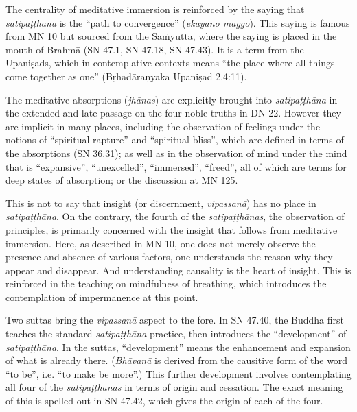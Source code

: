 \documentclass[12pt,openany]{book}%
\begin{document}
The centrality of meditative immersion is reinforced by the saying that \textit{\textsanskrit{satipaṭṭhāna}} is the “path to convergence” (\textit{\textsanskrit{ekāyano} maggo}). This saying is famous from MN 10 but sourced from the \textsanskrit{Saṁyutta}, where the saying is placed in the mouth of \textsanskrit{Brahmā} (SN 47.1, SN 47.18, SN 47.43). It is a term from the \textsanskrit{Upaniṣads}, which in contemplative contexts means “the place where all things come together as one” (\textsanskrit{Bṛhadāraṇyaka} \textsanskrit{Upaniṣad} 2.4:11).

The meditative absorptions (\textit{\textsanskrit{jhānas}}) are explicitly brought into \textit{\textsanskrit{satipaṭṭhāna}} in the extended and late passage on the four noble truths in DN 22. However they are implicit in many places, including the observation of feelings under the notions of “spiritual rapture” and “spiritual bliss”, which are defined in terms of the absorptions (SN 36.31); as well as in the observation of mind under the mind that is “expansive”, “unexcelled”, “immersed”, “freed”, all of which are terms for deep states of absorption; or the discussion at MN 125.

This is not to say that insight (or discernment, \textit{\textsanskrit{vipassanā}}) has no place in \textit{\textsanskrit{satipaṭṭhāna}}. On the contrary, the fourth of the \textit{\textsanskrit{satipaṭṭhānas}}, the observation of principles, is primarily concerned with the insight that follows from meditative immersion. Here, as described in MN 10, one does not merely observe the presence and absence of various factors, one understands the reason why they appear and disappear. And understanding causality is the heart of insight. This is reinforced in the teaching on mindfulness of breathing, which introduces the contemplation of impermanence at this point.

Two suttas bring the \textit{\textsanskrit{vipassanā}} aspect to the fore. In SN 47.40, the Buddha first teaches the standard \textit{\textsanskrit{satipaṭṭhāna}} practice, then introduces the “development” of \textit{\textsanskrit{satipaṭṭhāna}}. In the suttas, “development” means the enhancement and expansion of what is already there. (\textit{\textsanskrit{Bhāvanā}} is derived from the causitive form of the word “to be”, i.e. “to make be more”.) This further development involves contemplating all four of the \textit{\textsanskrit{satipaṭṭhānas}} in terms of origin and cessation. The exact meaning of this is spelled out in SN 47.42, which gives the origin of each of the four.
\end{document}
